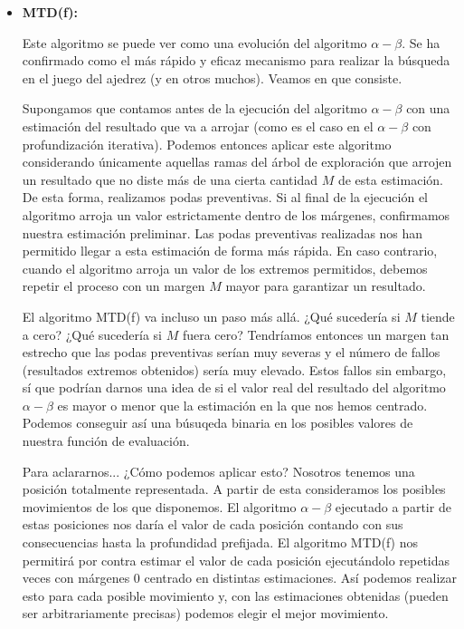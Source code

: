\documentclass[letterpaper,12pt]{article}
\begin{document}
\begin{itemize}
    \item \textbf{MTD(f):}
    
    Este algoritmo se puede ver como una evolución del algoritmo $\alpha-\beta$. Se ha confirmado
    como el más rápido y eficaz mecanismo para realizar la búsqueda en el juego del ajedrez (y
    en otros muchos). Veamos en que consiste.
    
    Supongamos que contamos antes de la ejecución del algoritmo $\alpha-\beta$ con una estimación
    del resultado que va a arrojar (como es el caso en el $\alpha-\beta$ con profundización 
    iterativa). Podemos entonces aplicar este algoritmo considerando únicamente aquellas ramas
    del árbol de exploración que arrojen un resultado que no diste más de una cierta cantidad
    $M$ de esta estimación. De esta forma, realizamos podas preventivas. Si al final de la 
    ejecución el algoritmo arroja un valor estrictamente dentro de los márgenes, confirmamos 
    nuestra estimación preliminar. Las podas preventivas realizadas nos han permitido llegar a
    esta estimación de forma más rápida. En caso contrario, cuando el algoritmo arroja un valor 
    de los extremos permitidos, debemos repetir el proceso con un margen $M$ mayor para garantizar
    un resultado.
    
    El algoritmo MTD(f) va incluso un paso más allá. ¿Qué sucedería si $M$ tiende a cero? ¿Qué
    sucedería si $M$ fuera cero? Tendríamos entonces un margen tan estrecho que las podas 
    preventivas serían muy severas y el número de fallos (resultados extremos obtenidos) sería
    muy elevado. Estos fallos sin embargo, sí que podrían darnos una idea de si el valor real
    del resultado del algoritmo $\alpha-\beta$ es mayor o menor que la estimación en la que nos
    hemos centrado. Podemos conseguir así una búsuqeda binaria en los posibles valores de nuestra
    función de evaluación. 
    
    Para aclararnos... ¿Cómo podemos aplicar esto? Nosotros tenemos una posición totalmente 
    representada. A partir de esta consideramos los posibles movimientos de los que disponemos.
    El algoritmo $\alpha-\beta$ ejecutado a partir de estas posiciones nos daría el valor de
    cada posición contando con sus consecuencias hasta la profundidad prefijada. El algoritmo
    MTD(f) nos permitirá por contra estimar el valor de cada posición ejecutándolo repetidas 
    veces con márgenes 0 centrado en distintas estimaciones. Así podemos realizar esto para
    cada posible movimiento y, con las estimaciones obtenidas (pueden ser arbitrariamente 
    precisas) podemos elegir el mejor movimiento.
    
\end{itemize}
\end{document}
